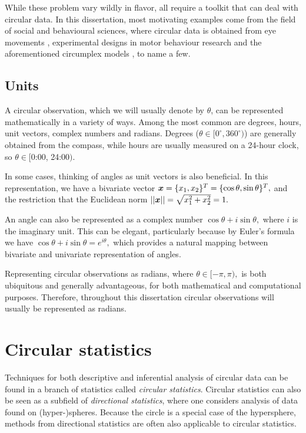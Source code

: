 \documentclass[12pt, a4paper]{book}\usepackage[]{graphicx}\usepackage{xcolor}
\begin{document}
 While these problem vary wildly in flavor, all require a toolkit that can deal with circular data. In this dissertation, most motivating examples come from the field of social and behavioural sciences, where circular data is obtained from eye movements \citep{tatler2009prominence}, experimental designs in  motor behaviour research \citep{mechsner2001perceptual, kaas2006haptic, mechsner2007bimanual, postma2008keep} and the aforementioned circumplex models \citep{Leary1957, gurtman2003circumplex,  gurtman2009exploring}, to name a few.


\subsection*{Units}

A circular observation, which we will usually denote by $\theta$, can be represented mathematically in a variety of ways. Among the most common are degrees, hours, unit vectors, complex numbers and radians. Degrees ($\theta \in [0^\circ, 360^\circ)$) are generally obtained from the compass, while hours are usually measured on a 24-hour clock, so $\theta \in [$0:00, 24:00$)$.

In some cases, thinking of angles as unit vectors is also beneficial. In this representation, we have a bivariate vector $\boldsymbol{x} = \{x_1, x_2\}^T = \{\cos\theta, \sin\theta\}^T,$ and the restriction that the Euclidean norm $\vert\vert \boldsymbol{x} \vert\vert = \sqrt{x_1^2 + x_2^2} = 1.$

An angle can also be represented as a complex number $\cos\theta + i \sin \theta,$ where $i$ is the imaginary unit. This can be elegant, particularly because by Euler's formula we have $\cos\theta + i \sin \theta = e^{i\theta},$ which provides a natural mapping between bivariate and univariate representation of angles.

Representing circular observations as radians, where $\theta \in [-\pi, \pi),$ is both ubiquitous and generally advantageous, for both mathematical and computational purposes. Therefore, throughout this dissertation circular observations will usually be represented as radians.


\section*{Circular statistics}

Techniques for both descriptive and inferential analysis of circular data can be found in a branch of statistics called \textit{circular statistics}. Circular statistics can also be seen as a subfield of \textit{directional statistics}, where one considers analysis of data found on (hyper-)spheres. Because the circle is a special case of the hypersphere, methods from directional statistics are often also applicable to circular statistics.
\end{document}
